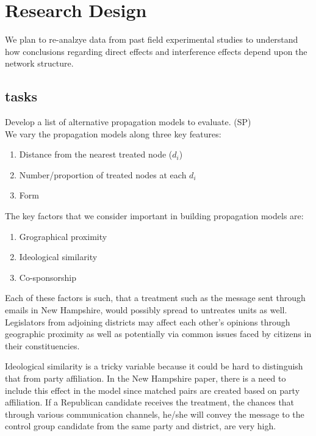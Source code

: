 \documentclass[12pt]{article}
\begin{document}
\section{Research Design}

We plan to re-analzye data from past field experimental studies to understand how conclusions regarding direct effects and interference effects depend upon the network structure.

\subsection{tasks}

Develop a list of alternative propagation models to evaluate. (SP) \\

We vary the propagation models along three key features:

\begin{enumerate}

\item Distance from the nearest treated node ($d_i$)
\item Number/proportion of treated nodes at each $d_i$
\item Form

\end{enumerate}


The key factors that we consider important in building propagation models are: \\

\begin{enumerate}

\item Grographical proximity
\item Ideological similarity
\item Co-sponsorship

\end{enumerate}

Each of these factors is such, that a treatment such as the message sent through emails in New Hampshire, would possibly spread to untreates units as well. Legislators from adjoining districts may affect each other's opinions through geographic proximity as well as potentially via common issues faced by citizens in their constituencies.

Ideological similarity is a tricky variable because it could be hard to distinguish that from party affiliation. In the New Hampshire paper, there is a need to include this effect in the model since matched pairs are created based on party affiliation. If a Republican candidate receives the treatment, the chances that through various communication channels, he/she will convey the message to the control group candidate from the same party and district, are very high.
\end{document}
